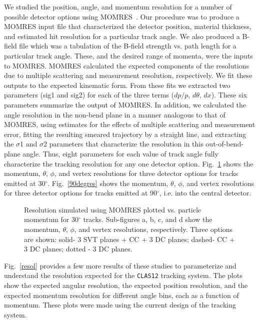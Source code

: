 We studied the position, angle, and momentum resolution for a number of 
possible detector options using MOMRES~\cite{momres}.  Our procedure was 
to produce a MOMRES input file that characterized the detector position, 
material thickness, and estimated hit resolution for a particular track 
angle.  We also produced a B-field file which was a tabulation of the 
B-field strength vs. path length for a particular track angle.  These, 
and the desired range of momenta, were the inputs to MOMRES. MOMRES 
calculated the expected components of the resolutions due to multiple 
scattering and measurement resolution, respectively.  We fit these outputs 
to the expected kinematic form. From these fits we extracted two parameters 
(sig1 and sig2) for each of the three terms ($dp/p$, $d\theta$, $dx$). 
These six parameters summarize the output of MOMRES. In addition, we 
calculated the angle resolution in the non-bend plane in a manner 
analogous to that of MOMRES, using estimates for the effects of multiple 
scattering and measurement error, fitting the resulting smeared trajectory 
by a straight line, and extracting the $\sigma$1 and $\sigma$2 parameters 
that characterize the resolution in this out-of-bend-plane angle.  Thus, 
eight parameters for each value of track angle fully characterize the 
tracking resolution for any one detector option.  Fig.~\ref{30degres} 
shows the momentum, $\theta$, $\phi$, and vertex resolutions for three 
detector options for tracks emitted at 30$^{\circ}$.  Fig.~\ref{90degres} 
shows the momentum, $\theta$, $\phi$, and vertex resolutions for three 
detector options for tracks emitted at 90$^{\circ}$, i.e. into the central 
detector. 

\begin{figure}[htpb]
\vspace{9.0cm}
\caption{\small{Resolution simulated using MOMRES plotted vs. particle 
momentum for 30$^{\circ}$ tracks.  Sub-figures a, b, c, and d show the 
momentum, $\theta$, $\phi$, and vertex resolutions, respectively.  Three 
options are shown: solid- 3 SVT planes + CC + 3 DC planes; dashed- CC + 
3 DC planes; dotted - 3 DC planes.}}
\label{30degres}
\end{figure}

Fig.~\ref{resol} provides a few more results of these studies to
parameterize and understand the resolution expected for the {\tt CLAS12}
tracking system.  The plots show the expected angular resolution, the 
expected position resolution, and the expected momentum resolution
for different angle bins, each as a function of momentum.  These plots
were made using the current design of the tracking system.

